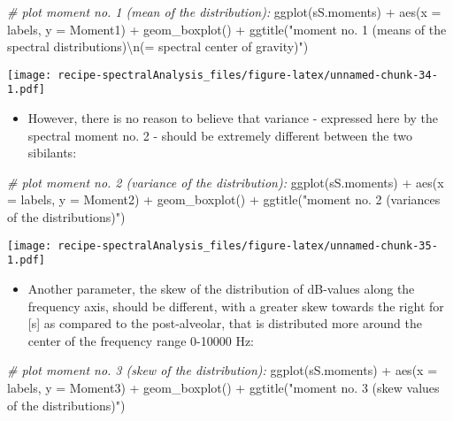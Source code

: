 \documentclass[
]{book}
\newenvironment{Shaded}{\begin{snugshade}}{\end{snugshade}}
\newcommand{\AttributeTok}[1]{\textcolor[rgb]{0.77,0.63,0.00}{#1}}
\newcommand{\CommentTok}[1]{\textcolor[rgb]{0.56,0.35,0.01}{\textit{#1}}}
\newcommand{\FunctionTok}[1]{\textcolor[rgb]{0.00,0.00,0.00}{#1}}
\newcommand{\NormalTok}[1]{#1}
\newcommand{\SpecialCharTok}[1]{\textcolor[rgb]{0.00,0.00,0.00}{#1}}
\newcommand{\StringTok}[1]{\textcolor[rgb]{0.31,0.60,0.02}{#1}}
\providecommand{\tightlist}{%
  \setlength{\itemsep}{0pt}\setlength{\parskip}{0pt}}
\begin{document}
\begin{Shaded}
\begin{Highlighting}[]
\CommentTok{\# plot moment no. 1 (mean of the distribution):}
\FunctionTok{ggplot}\NormalTok{(sS.moments) }\SpecialCharTok{+}
  \FunctionTok{aes}\NormalTok{(}\AttributeTok{x =}\NormalTok{ labels, }\AttributeTok{y =}\NormalTok{ Moment1) }\SpecialCharTok{+}
  \FunctionTok{geom\_boxplot}\NormalTok{() }\SpecialCharTok{+}
  \FunctionTok{ggtitle}\NormalTok{(}\StringTok{"moment no. 1 (means of the spectral distributions)}\SpecialCharTok{\textbackslash{}n}\StringTok{(= spectral center of gravity)"}\NormalTok{)}
\end{Highlighting}
\end{Shaded}

\texttt{[image: recipe-spectralAnalysis\_files/figure-latex/unnamed-chunk-34-1.pdf]}

\begin{itemize}
\tightlist
\item
  However, there is no reason to believe that variance - expressed here by the spectral moment no. 2 - should be extremely different between the two sibilants:
\end{itemize}

\begin{Shaded}
\begin{Highlighting}[]
\CommentTok{\# plot moment no. 2 (variance of the distribution):}
\FunctionTok{ggplot}\NormalTok{(sS.moments) }\SpecialCharTok{+}
  \FunctionTok{aes}\NormalTok{(}\AttributeTok{x =}\NormalTok{ labels, }\AttributeTok{y =}\NormalTok{ Moment2) }\SpecialCharTok{+}
  \FunctionTok{geom\_boxplot}\NormalTok{() }\SpecialCharTok{+}
  \FunctionTok{ggtitle}\NormalTok{(}\StringTok{"moment no. 2 (variances of the distributions)"}\NormalTok{)}
\end{Highlighting}
\end{Shaded}

\texttt{[image: recipe-spectralAnalysis\_files/figure-latex/unnamed-chunk-35-1.pdf]}

\begin{itemize}
\tightlist
\item
  Another parameter, the skew of the distribution of dB-values along the frequency axis, should be different, with a greater skew towards the right for {[}s{]} as compared to the post-alveolar, that is distributed more around the center of the frequency range 0-10000 Hz:
\end{itemize}

\begin{Shaded}
\begin{Highlighting}[]
\CommentTok{\# plot moment no. 3 (skew of the distribution):}
\FunctionTok{ggplot}\NormalTok{(sS.moments) }\SpecialCharTok{+}
  \FunctionTok{aes}\NormalTok{(}\AttributeTok{x =}\NormalTok{ labels, }\AttributeTok{y =}\NormalTok{ Moment3) }\SpecialCharTok{+}
  \FunctionTok{geom\_boxplot}\NormalTok{() }\SpecialCharTok{+}
  \FunctionTok{ggtitle}\NormalTok{(}\StringTok{"moment no. 3 (skew values of the distributions)"}\NormalTok{)}
\end{Highlighting}
\end{Shaded}
\end{document}
